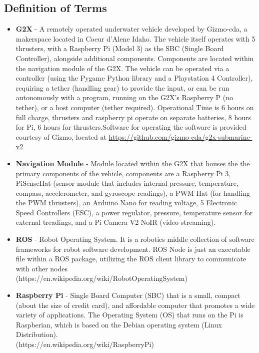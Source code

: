 \documentclass[12pt]{article}
\begin{document}
		\subsection{Definition of Terms}
			\begin{itemize}
				\item \textbf{G2X} - A remotely operated underwater vehicle developed by Gizmo-cda, a makerspace located in Coeur d'Alene Idaho. The vehicle itself operates with 5 thrusters, with a Raspberry Pi (Model 3) as the SBC (Single Board Controller), alongside additional components. Components are located within the navigation module of the G2X. The vehicle can be operated via a controller (using the Pygame Python library and a Playstation 4 Controller), requiring a tether (handling gear) to provide the input, or can be run autonomously with a program, running on the G2X's Raspberry P (no tether), or a host computer (tether required). Operational Time is 6 hours on full charge, thrusters and raspberry pi operate on separate batteries, 8 hours for Pi, 6 hours for thrusters.Software for operating the software is provided courtesy of Gizmo, located at \url{https://github.com/gizmo-cda/g2x-submarine-v2}
				\item \textbf{Navigation Module} - Module located within the G2X that houses the the primary components of the vehicle, components are a Raspberry Pi 3, PiSenseHat (sensor module that includes internal pressure, temperature, compass, accelerometer, and gyroscope readings), a PWM Hat (for handling the PWM thrusters), an Arduino Nano for reading voltage, 5 Electronic Speed Controllers (ESC), a power regulator, pressure, temperature sensor for external treadings, and a Pi Camera V2 NoIR (video streaming).
				\item \textbf{ROS} - Robot Operating System. It is a robotics middle collection of software frameworks for robot software development. ROS Node is just an executable file within a ROS package, utilizing the ROS client library to communicate with other nodes\\ (https://en.wikipedia.org/wiki/Robot\textunderscore Operating\textunderscore System)
				\item \textbf{Raspberry Pi} - Single Board Computer (SBC) that is a small, compact (about the size of credit card), and affordable computer that promotes a wide variety of applications. The Operating System (OS) that runs on the Pi is Raspberian, which is based on the Debian operating system (Linux Distribution).\\ (https://en.wikipedia.org/wiki/Raspberry\textunderscore Pi)	

\end{itemize}
\end{document}
